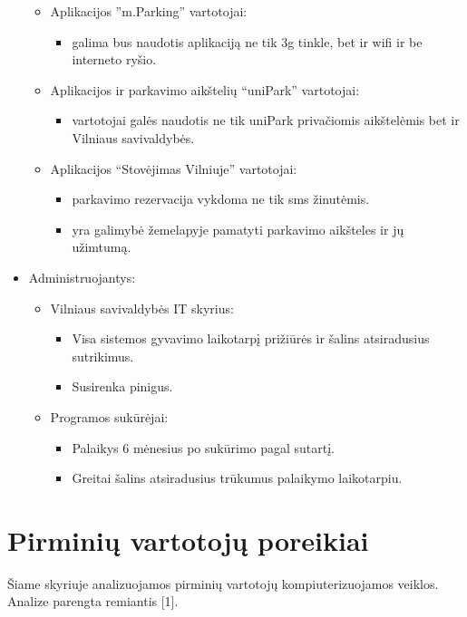 \documentclass{VUMIFPSkursinis}
\begin{document}
\begin{itemize}[label={}]
\begin{itemize}[label={$\bullet$}]
\begin{itemize}[label={--}]
				\end{itemize}					
			\item Aplikacijos ”m.Parking” vartotojai:
				\begin{itemize}[label={--}]
					\item galima bus naudotis aplikaciją ne tik 3g tinkle, bet ir wifi ir be interneto ryšio.
				\end{itemize}
			\item Aplikacijos ir parkavimo aikštelių “uniPark” vartotojai:
				\begin{itemize}[label={--}]
					\item vartotojai galės naudotis ne tik uniPark privačiomis aikštelėmis bet ir Vilniaus savivaldybės.
				\end{itemize}
			\item Aplikacijos “Stovėjimas Vilniuje” vartotojai:
				\begin{itemize}[label={--}]
					\item parkavimo rezervacija vykdoma ne tik sms žinutėmis.
					\item yra galimybė žemelapyje pamatyti parkavimo aikšteles ir jų užimtumą.
				\end{itemize}
		\end{itemize}
	\item Administruojantys:
		\begin{itemize}[label={$\bullet$}]
			\item Vilniaus savivaldybės IT skyrius:
				\begin{itemize}[label={--}]
					\item Visa sistemos gyvavimo laikotarpį prižiūrės ir šalins atsiradusius sutrikimus.
					\item Susirenka pinigus.
				\end{itemize}					
			\item Programos sukūrėjai:
				\begin{itemize}[label={--}]
					\item Palaikys 6 mėnesius po sukūrimo pagal sutartį.
					\item Greitai šalins atsiradusius trūkumus palaikymo laikotarpiu.
				\end{itemize}
		\end{itemize}
\end{itemize}

\section{Pirminių vartotojų poreikiai}
Šiame skyriuje analizuojamos pirminių vartotojų kompiuterizuojamos veiklos. Analize parengta remiantis [1].
\end{document}
